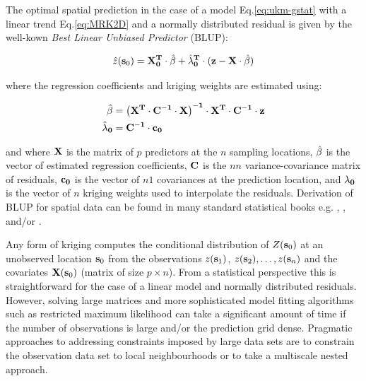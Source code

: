 \documentclass[11pt]{krantz}
\theoremstyle{definition}
\theoremstyle{definition}
\theoremstyle{definition}
\theoremstyle{remark}
\begin{document}
The optimal spatial prediction in the case of a model
Eq.\eqref{eq:ukm-gstat} with a linear trend Eq.\eqref{eq:MRK2D} and a
normally distributed residual is given by the well-kown \emph{Best
Linear Unbiased Predictor} (BLUP):

\[\label{E:BLUP}
\hat z({{\bf{s}}_0}) = {\bf{X}}_{\bf{0}}^{\bf{T}}\cdot \hat{\bf{\beta}} + \hat{\bf{\lambda}}_{\bf{0}}^{\bf{T}}\cdot({\bf{z}} - {\bf{X}}\cdot \hat{\bf{\beta}} )\]

where the regression coefficients and kriging weights are estimated
using:

\begin{equation}
\begin{aligned}
\hat{\bf{\beta}}  &= {\left( {{{\bf{X}}^{\bf{T}}}\cdot{{\bf{C}}^{ - {\bf{1}}}}\cdot{\bf{X}}} \right)^{ - {\bf{1}}}}\cdot{{\bf{X}}^{\bf{T}}}\cdot{{\bf{C}}^{ - {\bf{1}}}}\cdot{\bf{z}} \\
\hat{\bf{\lambda}}_{\bf{0}} &= \bf{C}^{ - {\bf{1}}} \cdot {\bf{c}}_{\bf{0}} \notag\end{aligned}
\label{eq:betas}
\end{equation}

and where \({\bf{X}}\) is the matrix of \(p\) predictors at the \(n\)
sampling locations, \(\hat{\bf{\beta}}\) is the vector of estimated
regression coefficients, \(\bf{C}\) is the \(n\)\(n\)
variance-covariance matrix of residuals, \(\bf{c}_{\bf{0}}\) is the
vector of \(n\)\(1\) covariances at the prediction location, and
\(\bf{\lambda}_{\bf{0}}\) is the vector of \(n\) kriging weights used to
interpolate the residuals. Derivation of BLUP for spatial data can be
found in many standard statistical books e.g. \citet{Stein1999Springer},
\citet[p.277]{Christensen2001Springer},
\citet[p.425--430]{Venables2002Springer} and/or
\citet{schabenberger2005statistical}.

Any form of kriging computes the conditional distribution of
\(Z({\bf{s}}_0)\) at an unobserved location \({\bf{s}}_0\) from the
observations \(z({\bf{s}}_1 )\),
\(z({\bf{s}}_2 ), \ldots , z({\bf{s}}_n )\) and the covariates
\({\bf{X}}({\bf{s}}_0)\) (matrix of size \(p \times n\)). From a
statistical perspective this is straightforward for the case of a linear
model and normally distributed residuals. However, solving large
matrices and more sophisticated model fitting algorithms such as
restricted maximum likelihood can take a significant amount of time if
the number of observations is large and/or the prediction grid dense.
Pragmatic approaches to addressing constraints imposed by large data
sets are to constrain the observation data set to local neighbourhoods
or to take a multiscale nested approach.
\end{document}
